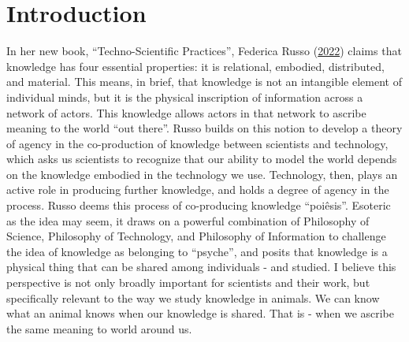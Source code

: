\documentclass[twoside,12pt,final]{ucthesis-CA2012}
\begin{document}
\begin{ucfrontmatter}
\begin{abstract}
  \end{abstract}
	\tableofcontents

	  \listoftables
  
    \listoffigures
  
\end{ucfrontmatter}
\begin{ucmainmatter}

\hypertarget{introduction}{%
\chapter*{Introduction}\label{introduction}}


In her new book, ``Techno-Scientific Practices'', Federica Russo (\protect\hyperlink{ref-russo2022}{2022}) claims that knowledge has four essential properties: it is relational, embodied, distributed, and material. This means, in brief, that knowledge is not an intangible element of individual minds, but it is the physical inscription of information across a network of actors. This knowledge allows actors in that network to ascribe meaning to the world ``out there''. Russo builds on this notion to develop a theory of agency in the co-production of knowledge between scientists and technology, which asks us scientists to recognize that our ability to model the world depends on the knowledge embodied in the technology we use. Technology, then, plays an active role in producing further knowledge, and holds a degree of agency in the process. Russo deems this process of co-producing knowledge ``poiêsis''. Esoteric as the idea may seem, it draws on a powerful combination of Philosophy of Science, Philosophy of Technology, and Philosophy of Information to challenge the idea of knowledge as belonging to ``psyche'', and posits that knowledge is a physical thing that can be shared among individuals - and studied. I believe this perspective is not only broadly important for scientists and their work, but specifically relevant to the way we study knowledge in animals. We can know what an animal knows when our knowledge is shared. That is - when we ascribe the same meaning to world around us.


\end{ucmainmatter}
\end{document}
